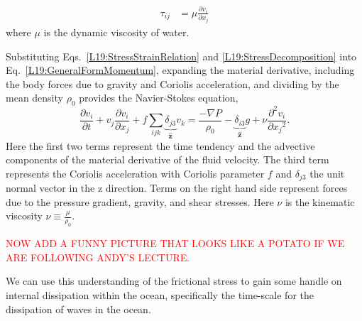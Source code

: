 \begin{align}
  \tau_{ij} &= \mu \frac{\partial v_i}{\partial x_j}
  \label{L19:StressStrainRelation}
\end{align}
where $\mu$ is the dynamic viscosity of water.

Substituting Eqs.~\eqref{L19:StressStrainRelation} and \eqref{L19:StressDecomposition} into Eq.~\eqref{L19:GeneralFormMomentum}, expanding the material derivative, including the body forces due to gravity and Coriolis acceleration, and dividing by the mean density $\rho_0$ provides the Navier-Stokes equation,
\begin{equation}
    \frac{\partial v_i}{\partial t} + v_j\frac{\partial v_i}{\partial x_j} + f\sum_{ijk}\underbrace{\delta_{j3}}_{\hat{\boldsymbol{z}}} v_k = \frac{-\nabla P}{\rho_0}-\underbrace{\delta_{i3}}_{\hat{\boldsymbol{z}}} g + \nu \frac{\partial^2 v_i}{\partial {x_j}^2}.\label{L19:NavierStokes}
\end{equation}
Here the first two terms represent the time tendency and the advective components of the material derivative of the fluid velocity. The third term represents the Coriolis acceleration with Coriolis parameter $f$ and $\delta_{j3}$ the unit normal vector in the z direction. Terms on the right hand side represent forces due to the pressure gradient, gravity, and shear stresses. Here $\nu$ is the kinematic viscosity $\nu \equiv \frac{\mu}{\rho_0}$.

\color{black}

\textcolor{red}{NOW ADD A FUNNY PICTURE THAT LOOKS LIKE A POTATO IF WE ARE FOLLOWING ANDY'S LECTURE.}

We can use this understanding of the frictional stress to gain some handle on internal dissipation within the ocean, specifically the time-scale for the dissipation of waves in the ocean.


